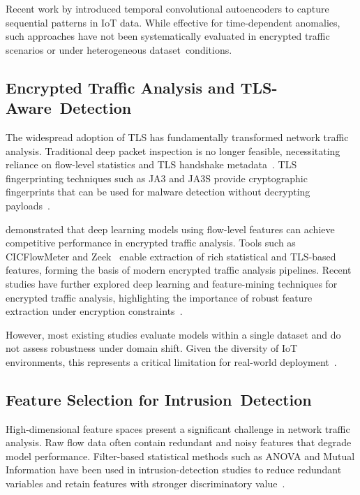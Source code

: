 \documentclass[futureinternet,article,accept,moreauthors]{Definitions/mdpi}
\begin{document}
Recent work by \citet{owoh2024} introduced temporal convolutional autoencoders to capture sequential patterns in IoT data. While effective for time-dependent anomalies, such approaches have not been systematically evaluated in encrypted traffic scenarios or under heterogeneous dataset~conditions.

\subsection{Encrypted Traffic Analysis and TLS-Aware~Detection}

The widespread adoption of TLS has fundamentally transformed network traffic analysis. Traditional deep packet inspection is no longer feasible, necessitating reliance on flow-level statistics and TLS handshake metadata~\cite{anderson2016, rezaei2022}. TLS fingerprinting techniques such as JA3 and JA3S provide cryptographic fingerprints that can be used for malware detection without decrypting payloads~\cite{althouse2019}.

\citet{fotiadou2021} demonstrated that deep learning models using flow-level features can achieve competitive performance in encrypted traffic analysis. Tools such as CICFlowMeter and Zeek~\cite{zeek2023} enable extraction of rich statistical and TLS-based features, forming the basis of modern encrypted traffic analysis pipelines.
Recent studies have further explored deep learning and feature-mining techniques for encrypted traffic analysis, highlighting the importance of robust feature extraction under encryption constraints~\cite{wang2023,long2023}.

However, most existing studies evaluate models within a single dataset and do not assess robustness under domain shift. Given the diversity of IoT environments, this represents a critical limitation for real-world deployment~\cite{cantone2024}.

\subsection{Feature Selection for Intrusion~Detection}

High-dimensional feature spaces present a significant challenge in network traffic analysis. Raw flow data often contain redundant and noisy features that degrade model performance. Filter-based statistical methods such as ANOVA and Mutual Information have been used in intrusion-detection studies to reduce redundant variables and retain features with stronger discriminatory value~\cite{amiri2011,alsarem2022}.
\end{document}
